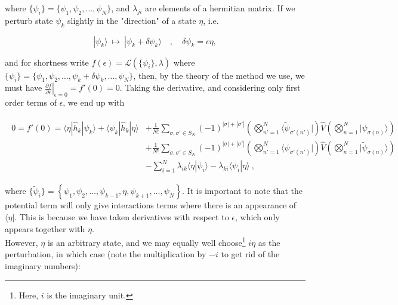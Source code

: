 \documentclass[10pt,twoside]{report}
\begin{document}
	\noindent where $\{\psi_i\} = \{\psi_1,\psi_2,\ldots,\psi_N\}$, and $\lambda_{ji}$ are elements of a hermitian matrix. If we perturb state $\psi_k$ slightly in the "direction" of a state $\eta$, i.e.
	
	\begin{equation}
		|\psi_k\rangle \:\mapsto\: |\psi_k + \delta\psi_k\rangle \quad,\quad \delta\psi_k = \epsilon\eta,
	\end{equation}
	
	\noindent and for shortness write $f(\epsilon) = \mathcal{L}\left( \{\psi_i\},\lambda \right)$ where $\{\psi_i\} = \{\psi_1,\psi_2,\ldots,\psi_k+\delta\psi_k,\ldots,\psi_N\}$, then, by the theory of the method we use, we must have $\left.\frac{\partial f}{\partial\epsilon}\right|_{\epsilon=0} = f'(0) = 0$. Taking the derivative, and considering only first order terms of $\epsilon$, we end up with
	
	\begin{align}
		\begin{split}
		0 = f'(0) =  \langle\eta|\hat{h}_k|\psi_k\rangle + \langle\psi_k|\hat{h}_k|\eta\rangle &+ \frac{1}{N!}\sum_{\sigma,\sigma'\in S_N} (-1)^{|\sigma|+|\sigma'|}\left(\bigotimes_{n'=1}^N \langle\widetilde{\psi}_{\sigma'(n')}|\right)\hat{V}\left(\bigotimes_{n=1}^N |\psi_{\sigma(n)}\rangle\right)\\
		&+ \frac{1}{N!}\sum_{\sigma,\sigma'\in S_N} (-1)^{|\sigma|+|\sigma'|}\left(\bigotimes_{n'=1}^N \langle\psi_{\sigma'(n')}|\right)\hat{V}\left(\bigotimes_{n=1}^N |\widetilde{\psi}_{\sigma(n)}\rangle\right)\\
		&- \sum_{i=1}^N \lambda_{ik}\langle\eta|\psi_i\rangle - \lambda_{ki}\langle\psi_i|\eta\rangle \:,
		\end{split}
		\label{MBQM | eq | "HF derivation 1"}
	\end{align}
	
	\noindent where $\{\widetilde{\psi}_i\} = \left\{\psi_1,\psi_2,\ldots,\psi_{k-1},\eta,\psi_{k+1},\ldots,\psi_N\right\}$. It is important to note that the potential term will only give interactions terms where there is an appearance of $\langle\eta|$. This is because we have taken derivatives with respect to $\epsilon$, which only appears together with $\eta$.\\
	
	However, $\eta$ is an arbitrary state, and we may equally well choose\footnote{Here, $i$ is the imaginary unit.} $i\eta$ as the perturbation, in which case (note the multiplication by $-i$ to get rid of the imaginary numbers):
	
\end{document}
